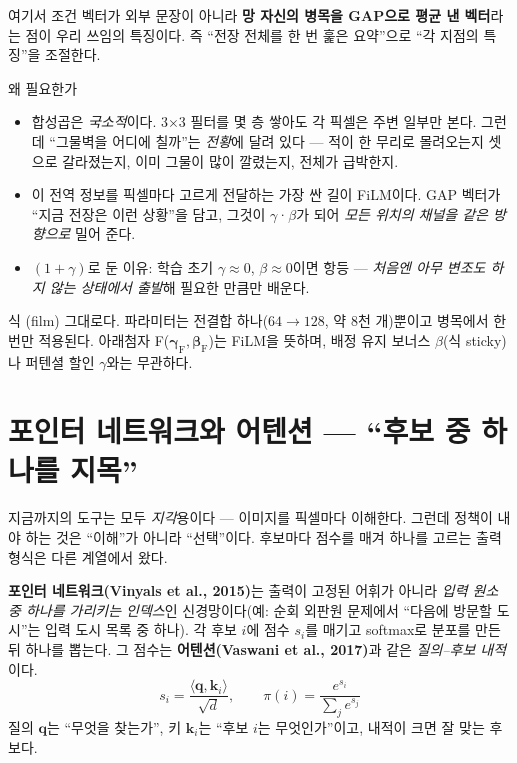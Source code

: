 \documentclass[11pt]{article}
\begin{document}
여기서 조건 벡터가 외부 문장이 아니라 \textbf{망 자신의 병목을 GAP으로 평균 낸 벡터}라는 점이 우리
쓰임의 특징이다. 즉 ``전장 전체를 한 번 훑은 요약''으로 ``각 지점의 특징''을 조절한다.

\begin{keybox}{왜 필요한가}
\begin{itemize}[leftmargin=*, itemsep=2pt]
\item 합성곱은 \emph{국소적}이다. 3$\times$3 필터를 몇 층 쌓아도 각 픽셀은 주변 일부만 본다. 그런데 ``그물벽을
      어디에 칠까''는 \emph{전황}에 달려 있다 --- 적이 한 무리로 몰려오는지 셋으로 갈라졌는지, 이미 그물이 많이
      깔렸는지, 전체가 급박한지.
\item 이 전역 정보를 픽셀마다 고르게 전달하는 가장 싼 길이 FiLM이다. GAP 벡터가 ``지금 전장은 이런 상황''을
      담고, 그것이 $\gamma$·$\beta$가 되어 \emph{모든 위치의 채널을 같은 방향으로} 밀어 준다.
\item $(1+\gamma)$로 둔 이유: 학습 초기 $\gamma \approx 0$, $\beta \approx 0$이면 항등 --- \emph{처음엔 아무
      변조도 하지 않는 상태에서 출발}해 필요한 만큼만 배운다.
\end{itemize}
\end{keybox}

\begin{whybox}
식 (film) 그대로다. 파라미터는 전결합 하나($64 \to 128$, 약 8천 개)뿐이고 병목에서 한 번만 적용된다.
아래첨자 F($\boldsymbol{\gamma}_{\mathrm{F}}, \boldsymbol{\beta}_{\mathrm{F}}$)는 FiLM을 뜻하며, 배정 유지 보너스
$\beta$(식 sticky)나 퍼텐셜 할인 $\gamma$와는 무관하다.
\end{whybox}

\section{포인터 네트워크와 어텐션 --- ``후보 중 하나를 지목''}

지금까지의 도구는 모두 \emph{지각}용이다 --- 이미지를 픽셀마다 이해한다. 그런데 정책이 내야 하는 것은
``이해''가 아니라 ``선택''이다. 후보마다 점수를 매겨 하나를 고르는 출력 형식은 다른 계열에서 왔다.

\textbf{포인터 네트워크(Vinyals et al., 2015)}는 출력이 고정된 어휘가 아니라 \emph{입력 원소 중 하나를 가리키는
인덱스}인 신경망이다(예: 순회 외판원 문제에서 ``다음에 방문할 도시''는 입력 도시 목록 중 하나). 각 후보 $i$에
점수 $s_i$를 매기고 softmax로 분포를 만든 뒤 하나를 뽑는다. 그 점수는 \textbf{어텐션(Vaswani et al., 2017)}과
같은 \emph{질의--후보 내적}이다.
\[
s_i = \frac{\langle \mathbf{q}, \mathbf{k}_i \rangle}{\sqrt{d}}, \qquad
\pi(i) = \frac{e^{s_i}}{\sum_j e^{s_j}}
\]
질의 $\mathbf{q}$는 ``무엇을 찾는가'', 키 $\mathbf{k}_i$는 ``후보 $i$는 무엇인가''이고, 내적이 크면 잘 맞는 후보다.
\end{document}

